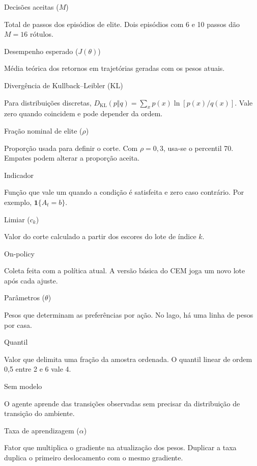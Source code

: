 Decisões aceitas ($M$)

Total de passos dos episódios de elite. Dois episódios com 6 e 10 passos dão $M=16$ rótulos.

Desempenho esperado ($J(\theta)$)

Média teórica dos retornos em trajetórias geradas com os pesos atuais.

Divergência de Kullback--Leibler (KL)

Para distribuições discretas, $D_{\mathrm{KL}}(p\Vert q)=\sum_x p(x)\ln[p(x)/q(x)]$. Vale zero quando coincidem e pode depender da ordem.

Fração nominal de elite ($\rho$)

Proporção usada para definir o corte. Com $\rho=0{,}3$, usa-se o percentil 70. Empates podem alterar a proporção aceita.

Indicador

Função que vale um quando a condição é satisfeita e zero caso contrário. Por exemplo, $\mathbf 1\{A_t=b\}$.

Limiar ($c_k$)

Valor do corte calculado a partir dos escores do lote de índice $k$.

On-policy

Coleta feita com a política atual. A versão básica do CEM joga um novo lote após cada ajuste.

Parâmetros ($\theta$)

Pesos que determinam as preferências por ação. No lago, há uma linha de pesos por casa.

Quantil

Valor que delimita uma fração da amostra ordenada. O quantil linear de ordem 0,5 entre 2 e 6 vale 4.

Sem modelo

O agente aprende das transições observadas sem precisar da distribuição de transição do ambiente.

Taxa de aprendizagem ($\alpha$)

Fator que multiplica o gradiente na atualização dos pesos. Duplicar a taxa duplica o primeiro deslocamento com o mesmo gradiente.
